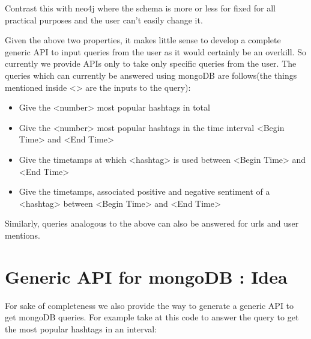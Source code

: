 \documentclass[letterpaper,10pt,english]{sphinxmanual}
\begin{document}
Contrast this with neo4j where the schema is more or less for fixed for all practical purposes and the user can’t easily change it.

Given the above two properties, it makes little sense to develop a complete generic API to input queries from the user as it would certainly be an overkill. So currently we provide APIs only to take only specific queries from the user. The queries which can currently be answered using mongoDB are follows(the things mentioned inside \textless{}\textgreater{} are the inputs to the query):
\begin{itemize}
\item {} 
Give the \textless{}number\textgreater{} most popular hashtags in total

\item {} 
Give the \textless{}number\textgreater{} most popular hashtags in the time interval \textless{}Begin Time\textgreater{} and \textless{}End Time\textgreater{}

\item {} 
Give the timetamps at which \textless{}hashtag\textgreater{} is used between \textless{}Begin Time\textgreater{} and \textless{}End Time\textgreater{}

\item {} 
Give the timetamps, associated positive and negative sentiment of a \textless{}hashtag\textgreater{} between \textless{}Begin Time\textgreater{} and \textless{}End Time\textgreater{}

\end{itemize}

Similarly, queries analogous to the above can also be answered for urls and user mentions.


\section{Generic API for mongoDB : Idea}
\label{\detokenize{mongoDB_query_generation:generic-api-for-mongodb-idea}}
For sake of completeness we also provide the way to generate a generic API to get mongoDB queries. For example take at this code to answer the query to get the most popular hashtags in an interval:
\end{document}
